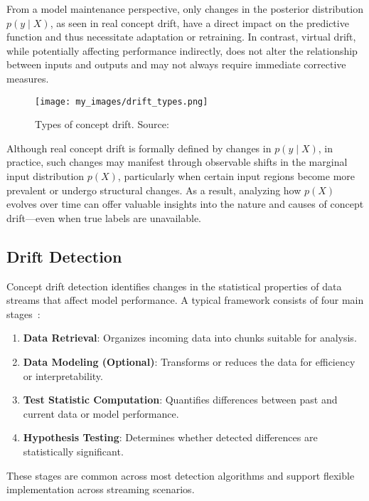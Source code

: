 From a model maintenance perspective, only changes in the posterior
distribution $p(y \mid X)$, as seen in real concept drift, have a direct impact
on the predictive function and thus necessitate adaptation or retraining. In
contrast, virtual drift, while potentially affecting performance indirectly,
does not alter the relationship between inputs and outputs and may not always
require immediate corrective measures.

\begin{figure}[h]
    \centering
    \texttt{[image: my\_images/drift\_types.png]}
    \caption{Types of concept drift. Source:~\cite{drift_adaptation_survey}}\label{fig:concept_drift_types}
\end{figure}

Although real concept drift is formally defined by changes in $p(y \mid X)$, in
practice, such changes may manifest through observable shifts in the marginal
input distribution $p(X)$, particularly when certain input regions become more
prevalent or undergo structural changes. As a result, analyzing how $p(X)$
evolves over time can offer valuable insights into the nature and causes of
concept drift—even when true labels are unavailable.

\subsection*{Drift Detection}\label{subsec:drift_detection}
Concept drift detection identifies changes in the statistical properties of
data streams that affect model performance. A typical framework consists of
four main stages~\cite{learning_under_concept_drift}:

\begin{enumerate}
    \item \textbf{Data Retrieval}: Organizes incoming data into chunks
          suitable for analysis.
    \item \textbf{Data Modeling (Optional)}: Transforms or reduces the data
          for efficiency or interpretability.
    \item \textbf{Test Statistic Computation}: Quantifies differences between
          past and current data or model performance.
    \item \textbf{Hypothesis Testing}: Determines whether detected differences
          are statistically significant.
\end{enumerate}

These stages are common across most detection algorithms and support flexible
implementation across streaming scenarios.

